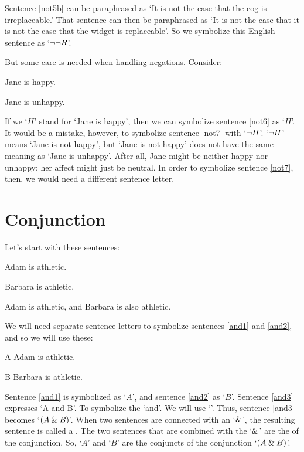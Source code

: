 Sentence \ref{not5b} can be paraphrased as `It is not the case that the cog is irreplaceable.' That sentence can then be paraphrased as `It is not the case that it is not the case that the widget is replaceable'. So we symbolize this English sentence as `${\neg}{\neg} R$'.

But some care is needed when handling negations. Consider:
	\begin{earg}
		\item[\ex{not6}] Jane is happy.
		\item[\ex{not7}] Jane is unhappy.
	\end{earg}
If we `$H$' stand for `Jane is happy', then we can symbolize sentence \ref{not6} as `$H$'. It would be a mistake, however, to symbolize sentence \ref{not7} with `${\neg}{H}$'. 
`${\neg}{H}$' means `Jane is not happy', but `Jane is not happy' does not have the same meaning as `Jane is unhappy'. After all, Jane might be neither happy nor unhappy; her affect might just be neutral. In order to symbolize sentence \ref{not7}, then, we would need a different sentence letter.


\section{Conjunction}
\label{s:ConnectiveConjunction}

Let's start with these sentences:
	\begin{earg}
		\item[\ex{and1}]Adam is athletic.
		\item[\ex{and2}]Barbara is athletic.
		\item[\ex{and3}]Adam is athletic, and Barbara is also athletic.
	\end{earg}
We will need separate sentence letters to symbolize sentences \ref{and1} and \ref{and2}, and so we will use these:
	\begin{ekey}
		\item[A] Adam is athletic.
		\item[B] Barbara is athletic.
	\end{ekey}
Sentence \ref{and1} is symbolized as `$A$', and sentence \ref{and2} as `$B$'. Sentence \ref{and3} expresses `A and B'. To symbolize the `and'. We will use `\eand'. Thus, sentence \ref{and3} becomes `$(A\mathbin{\&} B)$'. When two sentences are connected with an `$\mathbin{\&}$', the resulting sentence is called a . The two sentences that are combined with the `$\mathbin{\&}$' are the  of the conjunction. So, `$A$' and `$B$' are the conjuncts of the conjunction `$(A\mathbin{\&} B)$'.

